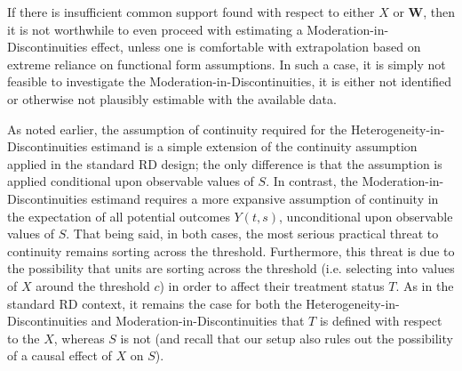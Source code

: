 \documentclass[12pt]{article}
\makeatletter
\renewcommand{\subsection}{\@startsection{subsection}{2}{0mm}{-\baselineskip}{0.25\baselineskip}{\raggedright\normalfont\normalsize\bf}}
\makeatother
\begin{document}
If there is insufficient common support found with respect to either $X$ or $\bm{W}$, then it is not worthwhile to even proceed with estimating a Moderation-in-Discontinuities effect, unless one is comfortable with extrapolation based on extreme reliance on functional form assumptions. In such a case, it is simply not feasible to investigate the Moderation-in-Discontinuities, it is either not identified or otherwise not plausibly estimable with the available data.


\subsection{Continuity} \label{subsec:continuity}



As noted earlier, the assumption of continuity required for the Heterogeneity-in-Discontinuities estimand is a simple extension of the continuity assumption applied in the standard RD design; the only difference is that the assumption is applied conditional upon observable values of $S$. In contrast, the Moderation-in-Discontinuities estimand requires a more expansive assumption of continuity in the expectation of all potential outcomes $Y(t,s)$, unconditional upon observable values of $S$. That being said, in both cases, the most serious practical threat to continuity remains sorting across the threshold. Furthermore, this threat is due to the possibility that units are sorting across the threshold (i.e. selecting into values of $X$ around the threshold $c$) in order to affect their treatment status $T$. As in the standard RD context, it remains the case for both the Heterogeneity-in-Discontinuities and Moderation-in-Discontinuities that $T$ is defined with respect to the $X$, whereas $S$ is not (and recall that our setup also rules out the possibility of a causal effect of $X$ on $S$). 
\end{document}
